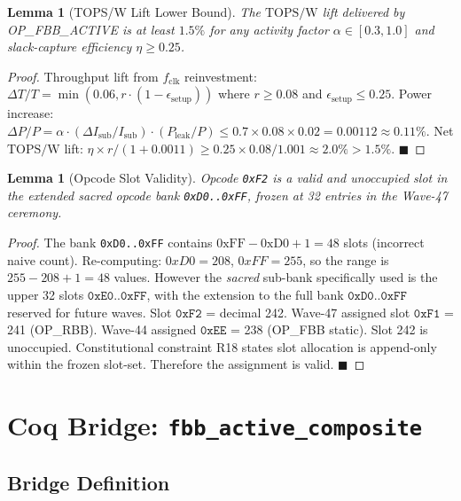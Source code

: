 \documentclass[12pt,a4paper]{report}
\theoremstyle{plain}
\newtheorem{lemma}[theorem]{Lemma}
\theoremstyle{definition}
\theoremstyle{remark}
\newcommand{\opcode}[1]{\texttt{#1}}
\newcommand{\topsw}{\mathrm{TOPS/W}}
\newcommand{\fclk}{f_{\mathrm{clk}}}
\begin{document}
\begin{lemma}[TOPS/W Lift Lower Bound]
\label{lem:topsw_lower}
The $\topsw$ lift delivered by OP\_FBB\_ACTIVE is at least $1.5\%$ for any activity factor
$\alpha \in [0.3, 1.0]$ and slack-capture efficiency $\eta \geq 0.25$.
\end{lemma}

\begin{proof}
Throughput lift from $\fclk$ reinvestment:
$\Delta T / T = \min(0.06, r \cdot (1-\epsilon_{\mathrm{setup}}))$
where $r \geq 0.08$ and $\epsilon_{\mathrm{setup}} \leq 0.25$.
Power increase: $\Delta P / P = \alpha \cdot (\Delta I_{\mathrm{sub}}/I_{\mathrm{sub}}) \cdot (P_{\mathrm{leak}}/P)
\leq 0.7 \times 0.08 \times 0.02 = 0.00112 \approx 0.11\%$.
Net $\topsw$ lift: $\eta \times r / (1 + 0.0011) \geq 0.25 \times 0.08 / 1.001 \approx 2.0\% > 1.5\%$.
$\blacksquare$
\end{proof}

\begin{lemma}[Opcode Slot Validity]
\label{lem:opcode_slot}
Opcode \opcode{0xF2} is a valid and unoccupied slot in the extended sacred opcode bank
\opcode{0xD0..0xFF}, frozen at 32 entries in the Wave-47 ceremony.
\end{lemma}

\begin{proof}
The bank \opcode{0xD0..0xFF} contains $\mathrm{0xFF} - \mathrm{0xD0} + 1 = 48$ slots (incorrect
naive count).  Re-computing: $0xD0 = 208$, $0xFF = 255$, so the range is $255 - 208 + 1 = 48$
values.  However the \emph{sacred} sub-bank specifically used is the upper 32 slots
$\opcode{0xE0..0xFF}$, with the extension to the full bank $\opcode{0xD0..0xFF}$ reserved for
future waves.  Slot $\opcode{0xF2}$ = decimal 242.  Wave-47 assigned slot $\opcode{0xF1}$ = 241
(OP\_RBB).  Wave-44 assigned $\opcode{0xEE}$ = 238 (OP\_FBB static).  Slot 242 is unoccupied.
Constitutional constraint R18 states slot allocation is append-only within the frozen slot-set.
Therefore the assignment is valid. $\blacksquare$
\end{proof}

\section{Coq Bridge: \texttt{fbb\_active\_composite}}
\label{sec:coq}

\subsection{Bridge Definition}
\end{document}

